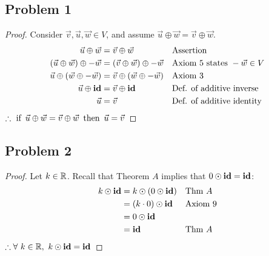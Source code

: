 




\subsection*{Problem 1}
\begin{proof}
  Consider $\vec{v}, \vec{u}, \vec{w} \in V$, and assume $\vec{u} \oplus \vec{w} = \vec{v} \oplus \vec{w}$.
  \begin{align*}
    \vec{u} \oplus \vec{w}                   & = \vec{v} \oplus \vec{w}                   &  & \text{Assertion}                     \\
    (\vec{u} \oplus \vec{w}) \oplus -\vec{w} & = (\vec{v} \oplus \vec{w}) \oplus -\vec{w} &  & \text{Axiom 5 states}~-\vec{w} \in V \\
    \vec{u} \oplus (\vec{w} \oplus -\vec{w}) & = \vec{v} \oplus (\vec{w} \oplus -\vec{w}) &  & \text{Axiom 3}                       \\
    \vec{u} \oplus \operatorname{\textbf{id}}                       & = \vec{v} \oplus \operatorname{\textbf{id}}                       &  & \text{Def. of additive inverse}      \\
    \vec{u}                                  & = \vec{v}                                  &  & \text{Def. of additive identity}
  \end{align*}
  $\therefore \operatorname{~\text{if}~} \vec{u} \oplus \vec{w} = \vec{v} \oplus \vec{w} \operatorname{~\text{then}~} \vec{u} = \vec{v}$
\end{proof}

\subsection*{Problem 2}
\begin{proof}
  Let $k \in \mathbb{R}$. Recall that Theorem $A$ implies that $0 \odot \operatorname{\textbf{id}} = \operatorname{\textbf{id}}$:
  \begin{align*}
    k \odot \operatorname{\textbf{id}} & = k \odot (0 \odot \operatorname{\textbf{id}}) &  & \text{Thm $A$} \\
                & = (k \cdot 0) \odot \operatorname{\textbf{id}} &  & \text{Axiom 9} \\
                & = 0 \odot \operatorname{\textbf{id}}                               \\
                & = \operatorname{\textbf{id}}                   &  & \text{Thm $A$}
  \end{align*}
  $\therefore \forall~k \in \mathbb{R},~k \odot \operatorname{\textbf{id}} = \operatorname{\textbf{id}}$
\end{proof}

